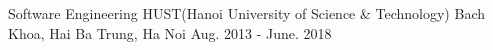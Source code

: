 

\begin{cventries}

    \cventry
    {Software Engineering} %
    {HUST(Hanoi University of Science \& Technology)} %
    {Bach Khoa, Hai Ba Trung, Ha Noi} %
    {Aug. 2013 - June. 2018} %
    {}

\end{cventries}
